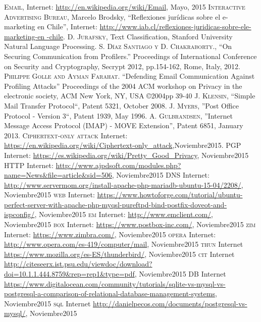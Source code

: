 \documentclass[12pt,oneside,onecolumn,openany]{report}
\begin{document}

\begin{thebibliography}{a}
   \textsc{Email}, Internet: \url{http://en.wikipedia.org/wiki/Email}, Mayo, 2015
   \textsc{Interactive Advertising Bureau}, Marcelo Brodsky, “Reflexiones jurídicas sobre el e-marketing en Chile”, Internet: \url{http://www.iab.cl/reflexiones-juridicas-sobre-ele-marketing-en -chile}.
   \textsc{D. Jurafsky}, Text Classification, Stanford University Natural Language Processing.
   \textsc{S. Díaz Santiago y D. Chakraborty.}, ``On Securing Communication from Profilers.” Proceedings of International Conference on Security and Cryptography, Secrypt 2012, pp.154-162, Rome, Italy, 2012.
   \textsc{Philippe  Golle and Ayman  Farahat}. ``Defending  Email  Communication  Against  Profiling  Attacks'' Proceedings  of  the  2004  ACM  workshop  on  Privacy  in  the  electronic  society, ACM  New  York,  NY, USA ©2004pp 39-40
   \textsc{J. Klensin}, ``Simple Mail Transfer Protocol``, Patent 5321, October 2008. 
   \textsc{J. Myers}, ''Post Office Protocol - Version 3``, Patent 1939, May 1996. 
   \textsc{A.  Gulbrandsen}, ''Internet  Message  Access  Protocol  (IMAP)  -  MOVE  Extension'',  Patent 6851, January 2013. 
   \textsc{Ciphertext-only attack} Internet: \url{https://en.wikipedia.org/wiki/Ciphertext-only_attack},Noviembre2015.
   \textsc{PGP} Internet: \url{https://es.wikipedia.org/wiki/Pretty_Good_Privacy}, Noviembre2015
   \textsc{HTTP} Internet: \url{http://www.ajpdsoft.com/modules.php?name=News&file=article&sid=506}, Noviembre2015
   \textsc{DNS} Internet: \url{http://www.servermom.org/install-apache-php-mariadb-ubuntu-15-04/2208/}, Noviembre2015
   \textsc{web} Internet: \url{https://www.howtoforge.com/tutorial/ubuntu-perfect-server-with-apache-php-myqsl-pureftpd-bind-postfix-doveot-and-ispconfig/}, Noviembre2015
   \textsc{em} Internet: \url{http://www.emclient.com/}, Noviembre2015
   \textsc{box} Internet: \url{https://www.postbox-inc.com/}, Noviembre2015
   \textsc{zim} Internet: \url{https://www.zimbra.com/}, Noviembre2015
   \textsc{opera} Internet: \url{http://www.opera.com/es-419/computer/mail}, Noviembre2015
   \textsc{thun} Internet \url{https://www.mozilla.org/es-ES/thunderbird/}, Noviembre2015
   \textsc{cit} Internet \url{http://citeseerx.ist.psu.edu/viewdoc/download?doi=10.1.1.444.8759&rep=rep1&type=pdf}, Noviembre2015
   \textsc{DB} Internet \url{https://www.digitalocean.com/community/tutorials/sqlite-vs-mysql-vs-postgresql-a-comparison-of-relational-database-management-systems}, Noviembre2015
   \textsc{sql} Internet \url{http://danielpecos.com/documents/postgresql-vs-mysql/}, Noviembre2015
\end{thebibliography}


 
 
\end{document}
